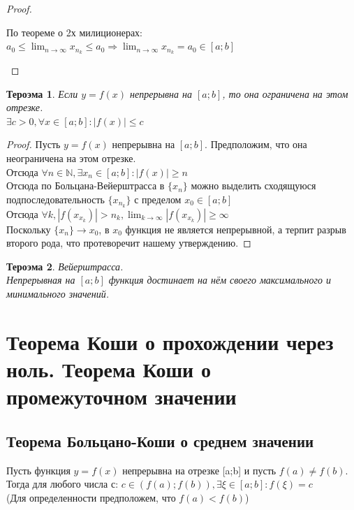 \documentclass[oneside]{book}
\newtheorem{thm}{Тероэма}[chapter] %
\begin{document}
\begin{enumerate}
\begin{proof}
\begin{center}
        По теореме о 2х милиционерах:\\
        $a_0 \leq \lim_{n \rightarrow \infty}{x_{n_k}} \leq a_0 \Rightarrow \lim_{n \rightarrow \infty}{x_{n_k}} = a_0 \in [a; b]$
    \end{center}
\end{proof}
\begin{thm}
Если $y = f(x)$ непрерывна на $[a; b]$, то она ограничена на этом отрезке. \\
$ \exists c > 0, \forall x \in [a;b]: |f(x)| \leq c $
\end{thm}
\begin{proof}
    Пусть $y = f(x)$ непрерывна на $[a; b]$. Предположим, что она неограничена на этом отрезке. \\
    Отсюда $\forall n \in \mathbb{N}, \exists x_n \in [a;b]: |f(x)| \geq n$\\
    Отсюда по Больцана-Вейерштрасса в $\{x_n\}$ можно выделить сходящуюся подпоследовательность $\{x_{n_k}\}$ с пределом $x_0 \in [a; b]$\\
    Отсюда $\forall k, |f(x_{x_k})| > n_k, \lim_{k \rightarrow \infty}{|f(x_{x_k})|} \geq \infty$ \\
    Поскольку $\{x_n\} \rightarrow x_0$, в $x_0$ функция не является непрерывной, а терпит разрыв второго рода, что протеворечит нашему утверждению.
\end{proof}

\begin{thm}
    Вейерштрасса. \\
    Непрерывная на $[a; b]$ функция достинает на нём своего максимального и минимального значений.
\end{thm}

\chapter {Теорема Коши о прохождении через ноль. Теорема Коши о промежуточном значении\\}
\section{Теорема Больцано-Коши о среднем значении}
Пусть функция $y = f(x)$ непрерывна на отрезке [a;b] и пусть $f(a)\neq f(b)$. Тогда для любого числа с: $c \in (f(a); f(b)), \exists \xi \in [a; b]: f(\xi)=c$
\\(Для определенности предположем, что $f(a)<f(b)$)

\end{enumerate}
\end{document}
